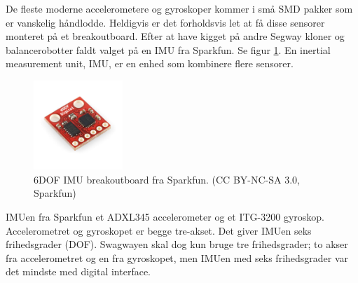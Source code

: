 \documentclass[a4paper,oneside,article,danish,table]{memoir}
\begin{document}
De fleste moderne accelerometere og gyroskoper kommer i små SMD pakker som er vanskelig håndlodde. Heldigvis er det forholdsvis let at få disse sensorer monteret på et breakoutboard. Efter at have kigget på andre Segway kloner og balancerobotter faldt valget på en IMU fra Sparkfun. Se figur \ref{fig:imu}. En inertial measurement unit, IMU, er en enhed som kombinere flere sensorer.
\begin{figure}[htbp]
  \centering
  \includegraphics[width=0.3\textwidth]{pictures/imu.jpg}
  \caption[6DOF IMU breakoutboard fra Sparkfun]{6DOF IMU breakoutboard fra Sparkfun. (CC BY-NC-SA 3.0, Sparkfun)}
  \label{fig:imu}
\end{figure}
IMUen fra Sparkfun et ADXL345 accelerometer og et ITG-3200 gyroskop. Accelerometret og gyroskopet er begge tre-akset.  Det giver IMUen seks frihedsgrader (DOF). Swagwayen skal dog kun bruge tre frihedsgrader; to akser fra accelerometret og en fra gyroskopet, men IMUen med seks frihedsgrader var det mindste med digital interface.
\end{document}
